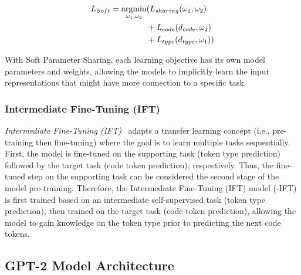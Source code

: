 \begin{equation}
\label{eq:2}
\begin{aligned}
    L_{Soft} = \argmin_{\omega_1, \omega_2}
    &( L_{sharing}(\omega_1, \omega_2)\\ 
    &+ L_{code}(d_{code}, \omega_2)\\
    &+ L_{type}(d_{type}, \omega_1))
\end{aligned}
\end{equation}

With Soft Parameter Sharing, each learning objective has its own model parameters and weights, allowing the models to implicitly learn the input representations that might have more connection to a specific task.


\subsubsection{Intermediate Fine-Tuning (IFT)}

\emph{Intermediate Fine-Tuning (IFT)}~\cite{phang2018sentence} adapts a transfer learning concept (i.e., pre-training then fine-tuning) where the goal is to learn multiple tasks sequentially. First, the model is fine-tuned on the supporting task (token type prediction) followed by the target task (code token prediction), respectively.
Thus, the fine-tuned step on the supporting task can be considered the second stage of the model pre-training.
Therefore, the Intermediate Fine-Tuning (IFT) model (\our-IFT) is first trained based on an intermediate self-supervised task (token type prediction), then trained on the target task (code token prediction), allowing the model to gain knowledge on the token type prior to predicting the next code tokens.


\subsection*{GPT-2 Model Architecture}

